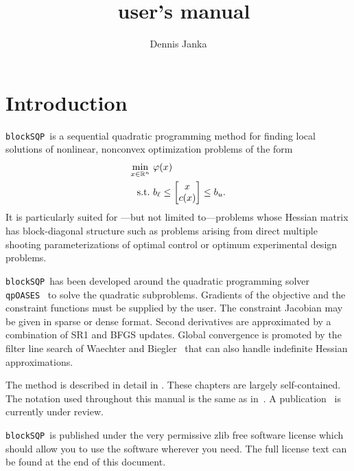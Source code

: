 \documentclass[	11pt,
				a4paper,
				abstract=true,
				twoside=true,
				bibliography=totoc, 
				headinclude=true,
				footinclude=false]{scrartcl}
\title{\blockSQP\ user's manual}
\author{Dennis Janka}
\newcommand{\R}{\mathbb{R}}				%
\newcommand{\st}{\textup{s.t.}}
\newcommand{\qpOASES}{\texttt{qpOASES}}
\newcommand{\blockSQP}{\texttt{blockSQP}}
\begin{document}
\maketitle
\tableofcontents
\clearpage
\section{Introduction}
\blockSQP\ is a sequential quadratic programming method for finding local solutions
of nonlinear, nonconvex optimization problems of the form
\begin{subequations}\label{eq:nlp}
\begin{align}
\min_{x\in\R^{n}}\ &\varphi(x) \\
\st\ & b_{\ell} \leq \begin{bmatrix} x\\c(x)\end{bmatrix} \leq b_{u}.
\end{align}
\end{subequations}
It is particularly suited for
---but not limited to---problems whose Hessian matrix has block-diagonal
structure such as problems arising from direct multiple shooting
parameterizations of optimal control or optimum experimental design problems.

\blockSQP\ has been developed around the quadratic programming solver
\qpOASES~\cite{Ferreau2013} to solve the quadratic subproblems. Gradients of the objective
and the constraint functions must be supplied by the user. The constraint Jacobian may be given in sparse or dense format. 
Second derivatives are approximated by a combination of SR1 and BFGS updates. 
Global convergence is promoted by the filter line search of Waechter and Biegler~\cite{Waechter2005b,Waechter2005}
that can also handle indefinite Hessian approximations.

The method is described in detail in \cite[Chapters 6--8]{Janka2015}. These chapters are largely self-contained. The notation used throughout this manual is the same as in~\cite{Janka2015}. A publication~\cite{Janka2015b} is currently under review.

\blockSQP\ is published under the very permissive zlib free software license which should allow you to use the software wherever you need. The full license text can be found at the end of this document.

\end{document}
